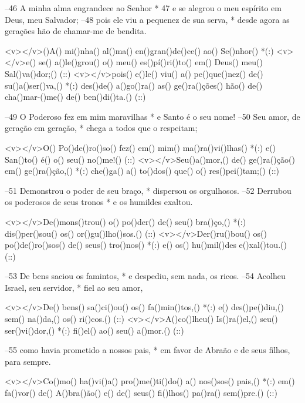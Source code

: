 –46 A minha alma engrandece ao Senhor *
47 e se alegrou o meu espírito em Deus, meu Salvador;
–48 pois ele viu a pequenez de sua serva, *
desde agora as gerações hão de chamar-me de bendita.

<v></v>()A() mi()nha() al()ma() en()gran()de()ce() ao() Se()nhor() *(:)
<v></v>e() se() a()le()grou() o() meu() es()pí()ri()to() em() Deus() meu() Sal()va()dor;() (::)
<v></v>pois() e()le() viu() a() pe()que()nez() de() su()a()ser()va,() *(:)
des()de() a()go()ra() as() ge()ra()ções() hão() de() cha()mar-()me() de() ben()di()ta.() (::)

–49 O Poderoso fez em mim maravilhas *
e Santo é o seu nome!
–50 Seu amor, de geração em geração, *
chega a todos que o respeitam;

<v></v>O() Po()de()ro()so() fez() em() mim() ma()ra()vi()lhas() *(:)
e() San()to() é() o() seu() no()me!() (::)
<v></v>Seu()a()mor,() de() ge()ra()ção() em() ge()ra()ção,() *(:)
che()ga() a() to()dos() que() o() res()pei()tam;() (::)

–51 Demonstrou o poder de seu braço, *
dispersou os orgulhosos.
–52 Derrubou os poderosos de seus tronos *
e os humildes exaltou.

<v></v>De()mons()trou() o() po()der() de() seu() bra()ço,() *(:)
dis()per()sou() os() or()gu()lho()sos.() (::)
<v></v>Der()ru()bou() os() po()de()ro()sos() de() seus() tro()nos() *(:)
e() os() hu()mil()des e()xal()tou.() (::)

–53 De bens saciou os famintos, *
e despediu, sem nada, os ricos.
–54 Acolheu Israel, seu servidor, *
fiel ao seu amor,

<v></v>De() bens() sa()ci()ou() os() fa()min()tos,() *(:)
e() des()pe()diu,() sem() na()da,() os() ri()cos.() (::)
<v></v>A()co()lheu() Is()ra()el,() seu() ser()vi()dor,() *(:)
fi()el() ao() seu() a()mor.() (::)

–55 como havia prometido a nossos pais, *
em favor de Abraão e de seus filhos, para sempre.

<v></v>Co()mo() ha()vi()a() pro()me()ti()do() a() nos()sos() pais,() *(:)
em() fa()vor() de() A()bra()ão() e() de() seus() fi()lhos() pa()ra() sem()pre.() (::)